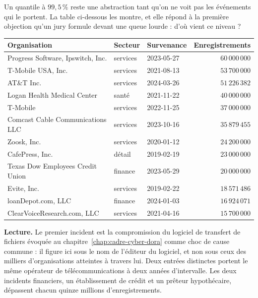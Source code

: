 Un quantile à $99{,}5\,\%$ reste une abstraction tant qu'on ne voit pas les événements qui le
portent. La table ci-dessous les montre, et elle répond à la première objection qu'un jury
formule devant une queue lourde : d'où vient ce niveau ?

\begin{center}\footnotesize
\renewcommand{\arraystretch}{1.08}
\begin{tabular}{@{}l l l r@{}}
\toprule
\textbf{Organisation} & \textbf{Secteur} & \textbf{Survenance} &
\textbf{Enregistrements} \\
\midrule
Progress Software, Ipswitch, Inc.     & services & 2023-05-27 & $60\,000\,000$ \\
T-Mobile USA, Inc.                    & services & 2021-08-13 & $53\,700\,000$ \\
AT\&T Inc.                            & services & 2024-03-26 & $51\,226\,382$ \\
Logan Health Medical Center           & santé    & 2021-11-22 & $40\,000\,000$ \\
T-Mobile                              & services & 2022-11-25 & $37\,000\,000$ \\
Comcast Cable Communications LLC      & services & 2023-10-16 & $35\,879\,455$ \\
Zoosk, Inc.                           & services & 2020-01-12 & $24\,200\,000$ \\
CafePress, Inc.                       & détail   & 2019-02-19 & $23\,000\,000$ \\
Texas Dow Employees Credit Union      & finance  & 2023-05-29 & $20\,000\,000$ \\
Evite, Inc.                           & services & 2019-02-22 & $18\,571\,486$ \\
loanDepot.com, LLC                    & finance  & 2024-01-03 & $16\,924\,071$ \\
ClearVoiceResearch.com, LLC           & services & 2021-04-16 & $15\,700\,000$ \\
\bottomrule
\end{tabular}
\end{center}

\vspace{2pt}
\noindent\textbf{Lecture.} Le premier incident est la compromission du logiciel de transfert de
fichiers évoquée au chapitre~\ref{chap:cadre-cyber-dora} comme choc de cause commune : il figure
ici sous le nom de l'éditeur du logiciel, et non sous ceux des milliers d'organisations atteintes
à travers lui. Deux entrées distinctes portent le même opérateur de télécommunications à deux
années d'intervalle. Les deux incidents financiers, un établissement de crédit et un prêteur
hypothécaire, dépassent chacun quinze millions d'enregistrements.

